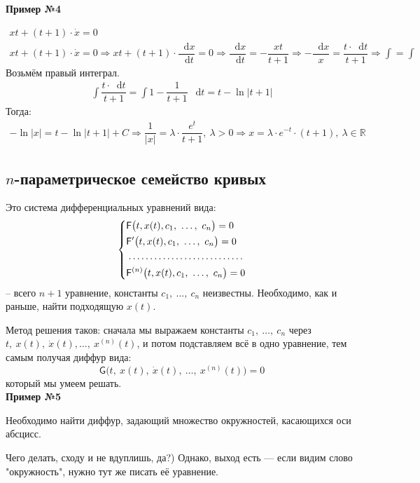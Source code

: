 \documentclass[a4paper,12pt]{article}
\newcommand{\R}{\mathbb{R}}
\renewcommand{\G}{\mathsf{G}}
\renewcommand*\d{\mathop{}\!\mathrm{d}}
\newcommand{\dx}{\dot{x}}
\newcommand{\F}{\mathsf{F}}
\newcommand{\ds}{\displaystyle}
\begin{document}
\textbf{Пример №4}

\begin{gather*}
	xt + (t + 1) \cdot \dx = 0\\
	xt + (t + 1) \cdot \dx = 0 \Longrightarrow xt + (t + 1) \cdot \dfrac{\d x}{\d t} = 0 \Longrightarrow \dfrac{\d x}{\d t}  = -\dfrac{xt}{t + 1} \Longrightarrow -\dfrac{\d x}{x} = \dfrac{t \cdot \d t}{t + 1} \Longrightarrow \ds\int = \int
\end{gather*}
Возьмём правый интеграл.
\begin{gather*}
	\ds\int \dfrac{t\cdot \d t}{t + 1} = \ds\int 1 - \dfrac{1}{t + 1}\ \d t = t - \ln |t + 1|
\end{gather*}
Тогда:
\begin{gather*}
	 -\ln|x| = t - \ln |t + 1| + C \Longrightarrow \dfrac{1}{|x|} = \lambda \cdot \dfrac{e^{t}}{t + 1},\ \lambda > 0 \Longrightarrow x = \lambda \cdot e^{-t} \cdot (t + 1),\ \lambda \in \R
\end{gather*}

\subsection{$n$-параметрическое семейство кривых}

Это система дифференциальных уравнений вида:
\[\left\{\begin{gathered}
	\F\big(t, x(t), c_1,\ \ldots,\ c_n\big) = 0\hfill\\
	\F'\big(t, x(t), c_1,\ \ldots,\ c_n\big) = 0\hfill\\
	\dotfill\\
	\F^{(n)}\big(t, x(t), c_1,\ \ldots,\ c_n\big) = 0\hfill
\end{gathered}\right.\] -- всего $n + 1$ уравнение, константы $c_1,\ \ldots,\ c_n$ неизвестны. Необходимо, как и раньше, найти подходящую $x(t)$.

Метод решения таков: сначала мы выражаем константы $c_1,\ \ldots,\ c_n$ через $t,\ x(t),\ \dx(t), \ldots,\ x^{(n)}(t)$, и потом подставляем всё в одно уравнение, тем самым получая диффур вида:
\[\G\big(t,\ x(t),\ \dx(t),\ \ldots,\ x^{(n)}(t)\big) = 0\] который мы умеем решать.
\ \\

\textbf{Пример №5}

Необходимо найти диффур, задающий множество окружностей, касающихся оси абсцисс.

Чего делать, сходу и не вдуплишь, да?) Однако, выход есть --- если видим слово "окружность", нужно тут же писать её уравнение. 
\end{document}
